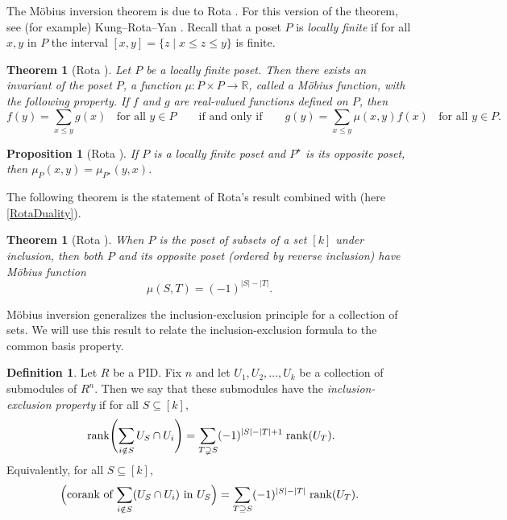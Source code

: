 \documentclass[a4paper]{amsart}
\newcommand{\R}{\mathbb{R}}
\numberwithin{theoremcounter}{section}
\newtheorem{theorem}[theoremauto]{Theorem}
\newtheorem{proposition}[propositionauto]{Proposition}
\theoremstyle{definition}
\newtheorem{definition}[Defauto]{Definition}
\theoremstyle{remark}
\newcommand{\mr}[1]{{\rm #1}}
\newcommand{\rank}{\mr{rank}}
\begin{document}
The M\"obius inversion theorem is due to Rota \cite{Rota}. For this version of the theorem, see (for example) Kung--Rota--Yan \cite[3.1.2. M\"obius Inversion Formula]{KungRotaYan}. Recall that a poset $P$ is \emph{locally finite} if for all $x,y$ in $P$ the interval $[x,y] = \{ z  \mid  x \leq z \leq y\}$ is finite. 

\begin{theorem}[Rota \cite{Rota}] \label{MobiusInversion}
 Let $P$ be a locally finite poset. Then there exists an invariant of the poset $P$, a function $\mu\colon  P\times P \to \R$, called a  \emph{M\"obius function}, with the following property. If $f$ and $g$ are real-valued functions defined on $P$, then 
$$ f(y) = \sum_{x \leq y} g(x) \; \; \text{ for all $y \in P$}  \qquad \text{if and only if} \qquad g(y) = \sum_{x \leq y} \mu(x,y) f(x)  \; \;  \text{ for all $y \in P$} .$$ 
\end{theorem} 

\begin{proposition}[Rota {\cite[Proposition 3 (Duality)]{Rota}}] \label{RotaDuality}  If $P$ is a locally finite poset and $P^{\star}$ is its opposite poset, then $\mu_P(x,y) = \mu_{P^{\star}}(y,x)$. 
\end{proposition} 

The following theorem is the statement of Rota's result \cite[Corollary (Principle if Inclusion-Exclusion)]{Rota} combined with  \cite[Proposition 3 (Duality)]{Rota}(here \autoref{RotaDuality}). 
 
\begin{theorem}[Rota \cite{Rota}] \label{MobiusSubsets}   When $P$ is the poset of subsets of a set $[k]$ under inclusion, then both $P$ and its opposite poset (ordered by reverse inclusion) have M\"obius function
$$ \mu(S,T) = (-1)^{|S|-|T|}.$$
\end{theorem} 


M\"obius inversion generalizes the inclusion-exclusion principle for a collection of sets. We will use this result to relate the inclusion-exclusion formula to the common basis property.  

\begin{definition} \label{DefnInclusionExclusionProperty} Let $R$ be a PID. Fix $n$ and let $U_1, U_2, \dots, U_k$ be a collection of  submodules of $R^n$. Then we say that these submodules  have the \emph{inclusion-exclusion property} if for all $S \subseteq [k]$, 
$$\text{ rank$\left(\sum_{i \notin S} U_S \cap U_i \right)$} = \sum_{T\supsetneq S} (-1)^{|S|-|T| +1} \; \rank(U_T). 
$$ 
Equivalently, for all $S \subseteq [k]$, 
 $$\Big(\text{corank of $\sum_{i \notin S} (U_S \cap U_i) $ in $U_S$}\Big)  = \sum_{T\supseteq S} (-1)^{|S|-|T|} \; \rank(U_T). 
$$ 
\end{definition}
\end{document}
